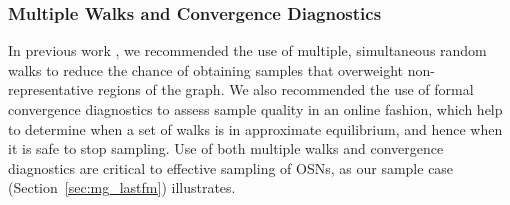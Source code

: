 \documentclass[10pt, conference]{./IEEEtran}
\begin{document}

\subsubsection{\label{sec:mg_diagnostics}Multiple Walks and Convergence Diagnostics}
%


In previous work \cite{Gjoka2010, Gjoka2011_Facebook_JSAC}, we recommended the use of multiple, simultaneous random walks to reduce the chance of obtaining samples that overweight non-representative regions of the graph.  We also recommended the use of formal convergence diagnostics to assess sample quality in an online fashion, which help to determine when a set of walks is in approximate equilibrium, and hence when it is safe to stop sampling.  Use of both multiple walks and convergence diagnostics are critical to effective sampling of OSNs, as our sample case (Section~\ref{sec:mg_lastfm}) illustrates.
\end{document}
